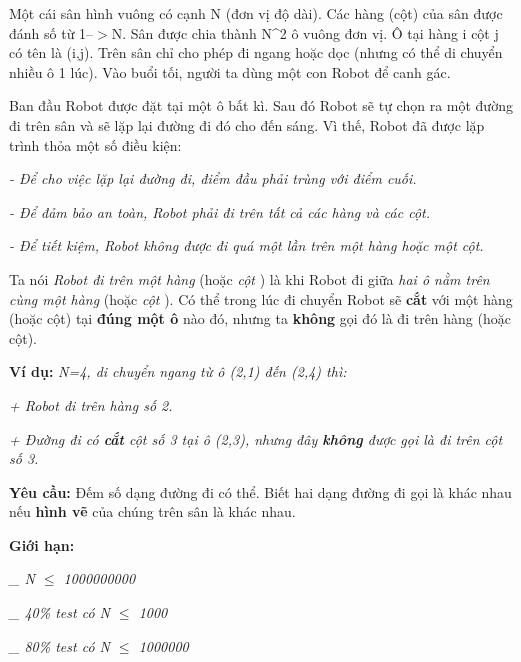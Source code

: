 Một cái sân hình vuông có cạnh N (đơn vị độ dài). Các hàng (cột) của sân được đánh số từ 1--$>$N. Sân được chia thành N^2 ô vuông đơn vị. Ô tại hàng i cột j có tên là (i,j). Trên sân chỉ cho phép đi ngang hoặc dọc (nhưng có thể di chuyển nhiều ô 1 lúc). Vào buổi tối, người ta dùng một con Robot để canh gác.  

   Ban đầu Robot được đặt tại một ô bất kì. Sau đó Robot sẽ tự chọn ra một đường đi trên sân và sẽ lặp lại đường đi đó cho đến sáng. Vì thế, Robot đã được lặp trình thỏa một số điều kiện:  

\emph{    - Để cho việc lặp lại đường đi, điểm đầu phải trùng với điểm cuối.   }

\emph{    - Để đảm bảo an toàn, Robot phải đi trên tất cả các hàng và các cột.    
\\}

\emph{    - Để tiết kiệm, Robot không được đi quá một lần trên một hàng hoặc một cột.   }

   Ta nói   \emph{    Robot đi trên một hàng   }   (hoặc   \emph{    cột   }   ) là khi Robot đi giữa   \emph{    hai ô nằm trên cùng một hàng   }   (hoặc   \emph{    cột   }   ). Có thể trong lúc đi chuyển Robot sẽ   \textbf{    cắt   }   với một hàng (hoặc cột) tại   \textbf{    đúng một ô   }   nào đó, nhưng ta   \textbf{    không   }   gọi đó là đi trên hàng (hoặc cột).  

\textbf{     Ví dụ:    }\emph{    N=4, di chuyển ngang từ ô (2,1) đến (2,4) thì:   }

\emph{    + Robot đi trên hàng số 2.   }

\emph{    + Đường đi có    \textbf{     cắt    }    cột số 3 tại ô (2,3), nhưng đây    \textbf{     không    }    được gọi là đi trên cột số 3.   }

\textbf{      Yêu cầu:     }   Đếm số dạng đường đi có thể. Biết hai dạng đường đi gọi là khác nhau nếu   \textbf{    hình vẽ   }   của chúng trên sân là khác nhau.  

\textbf{      Giới hạn:     }

\emph{    \_ N $\le$ 1000000000   }

\emph{    \_ 40\% test có N $\le$ 1000   }

\emph{    \_ 80\% test có N $\le$ 1000000   }